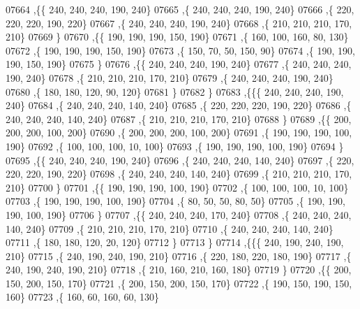 \begin{DoxyCode}
07664    ,\{\{   240,   240,   240,   190,   240\}
07665     ,\{   240,   240,   240,   190,   240\}
07666     ,\{   220,   220,   220,   190,   220\}
07667     ,\{   240,   240,   240,   190,   240\}
07668     ,\{   210,   210,   210,   170,   210\}
07669     \}
07670    ,\{\{   190,   190,   190,   150,   190\}
07671     ,\{   160,   100,   160,    80,   130\}
07672     ,\{   190,   190,   190,   150,   190\}
07673     ,\{   150,    70,    50,   150,    90\}
07674     ,\{   190,   190,   190,   150,   190\}
07675     \}
07676    ,\{\{   240,   240,   240,   190,   240\}
07677     ,\{   240,   240,   240,   190,   240\}
07678     ,\{   210,   210,   210,   170,   210\}
07679     ,\{   240,   240,   240,   190,   240\}
07680     ,\{   180,   180,   120,    90,   120\}
07681     \}
07682    \}
07683   ,\{\{\{   240,   240,   240,   190,   240\}
07684     ,\{   240,   240,   240,   140,   240\}
07685     ,\{   220,   220,   220,   190,   220\}
07686     ,\{   240,   240,   240,   140,   240\}
07687     ,\{   210,   210,   210,   170,   210\}
07688     \}
07689    ,\{\{   200,   200,   200,   100,   200\}
07690     ,\{   200,   200,   200,   100,   200\}
07691     ,\{   190,   190,   190,   100,   190\}
07692     ,\{   100,   100,   100,    10,   100\}
07693     ,\{   190,   190,   190,   100,   190\}
07694     \}
07695    ,\{\{   240,   240,   240,   190,   240\}
07696     ,\{   240,   240,   240,   140,   240\}
07697     ,\{   220,   220,   220,   190,   220\}
07698     ,\{   240,   240,   240,   140,   240\}
07699     ,\{   210,   210,   210,   170,   210\}
07700     \}
07701    ,\{\{   190,   190,   190,   100,   190\}
07702     ,\{   100,   100,   100,    10,   100\}
07703     ,\{   190,   190,   190,   100,   190\}
07704     ,\{    80,    50,    50,    80,    50\}
07705     ,\{   190,   190,   190,   100,   190\}
07706     \}
07707    ,\{\{   240,   240,   240,   170,   240\}
07708     ,\{   240,   240,   240,   140,   240\}
07709     ,\{   210,   210,   210,   170,   210\}
07710     ,\{   240,   240,   240,   140,   240\}
07711     ,\{   180,   180,   120,    20,   120\}
07712     \}
07713    \}
07714   ,\{\{\{   240,   190,   240,   190,   210\}
07715     ,\{   240,   190,   240,   190,   210\}
07716     ,\{   220,   180,   220,   180,   190\}
07717     ,\{   240,   190,   240,   190,   210\}
07718     ,\{   210,   160,   210,   160,   180\}
07719     \}
07720    ,\{\{   200,   150,   200,   150,   170\}
07721     ,\{   200,   150,   200,   150,   170\}
07722     ,\{   190,   150,   190,   150,   160\}
07723     ,\{   160,    60,   160,    60,   130\}

\end{DoxyCode}
